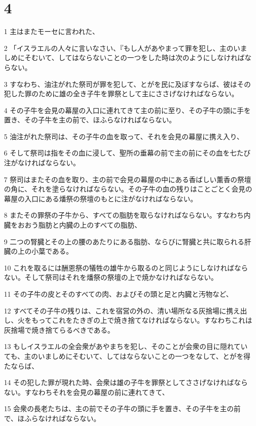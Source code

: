 \chapter{4}

\par 1 主はまたモーセに言われた、
\par 2 「イスラエルの人々に言いなさい、『もし人があやまって罪を犯し、主のいましめにそむいて、してはならないことの一つをした時は次のようにしなければならない。
\par 3 すなわち、油注がれた祭司が罪を犯して、とがを民に及ぼすならば、彼はその犯した罪のために雄の全き子牛を罪祭として主にささげなければならない。
\par 4 その子牛を会見の幕屋の入口に連れてきて主の前に至り、その子牛の頭に手を置き、その子牛を主の前で、ほふらなければならない。
\par 5 油注がれた祭司は、その子牛の血を取って、それを会見の幕屋に携え入り、
\par 6 そして祭司は指をその血に浸して、聖所の垂幕の前で主の前にその血を七たび注がなければならない。
\par 7 祭司はまたその血を取り、主の前で会見の幕屋の中にある香ばしい薫香の祭壇の角に、それを塗らなければならない。その子牛の血の残りはことごとく会見の幕屋の入口にある燔祭の祭壇のもとに注がなければならない。
\par 8 またその罪祭の子牛から、すべての脂肪を取らなければならない。すなわち内臓をおおう脂肪と内臓の上のすべての脂肪、
\par 9 二つの腎臓とその上の腰のあたりにある脂肪、ならびに腎臓と共に取られる肝臓の上の小葉である。
\par 10 これを取るには酬恩祭の犠牲の雄牛から取るのと同じようにしなければならない。そして祭司はそれを燔祭の祭壇の上で焼かなければならない。
\par 11 その子牛の皮とそのすべての肉、およびその頭と足と内臓と汚物など、
\par 12 すべてその子牛の残りは、これを宿営の外の、清い場所なる灰捨場に携え出し、火をもってこれをたきぎの上で焼き捨てなければならない。すなわちこれは灰捨場で焼き捨てらるべきである。
\par 13 もしイスラエルの全会衆があやまちを犯し、そのことが会衆の目に隠れていても、主のいましめにそむいて、してはならないことの一つをなして、とがを得たならば、
\par 14 その犯した罪が現れた時、会衆は雄の子牛を罪祭としてささげなければならない。すなわちそれを会見の幕屋の前に連れてきて、
\par 15 会衆の長老たちは、主の前でその子牛の頭に手を置き、その子牛を主の前で、ほふらなければならない。
